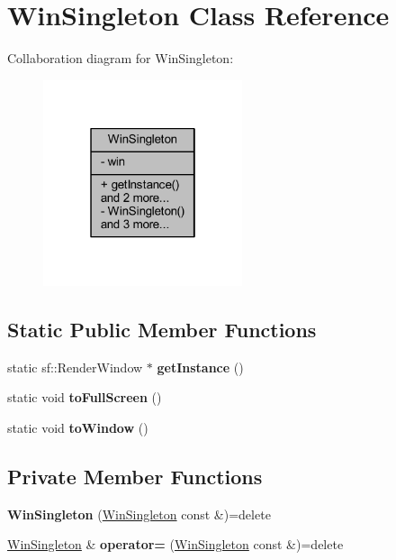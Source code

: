 \hypertarget{class_win_singleton}{}\section{Win\+Singleton Class Reference}
\label{class_win_singleton}


Collaboration diagram for Win\+Singleton\+:\nopagebreak
\begin{figure}[H]
\begin{center}
\leavevmode
\includegraphics[width=166pt]{class_win_singleton__coll__graph}
\end{center}
\end{figure}
\subsection*{Static Public Member Functions}
\begin{DoxyCompactItemize}
\item 
\mbox{\label{class_win_singleton_a82935bb60c8e4bb14350ac45813b33ca}} 
static sf\+::\+Render\+Window $\ast$ {\bfseries get\+Instance} ()
\item 
\mbox{\label{class_win_singleton_a58684b65df9dadcdc798faba86aeb0b6}} 
static void {\bfseries to\+Full\+Screen} ()
\item 
\mbox{\label{class_win_singleton_abba34d9cbdf6a9ff14da654b2b88aba3}} 
static void {\bfseries to\+Window} ()
\end{DoxyCompactItemize}
\subsection*{Private Member Functions}
\begin{DoxyCompactItemize}
\item 
\mbox{\label{class_win_singleton_a8afac0ce148375d8e3d953e881891b53}} 
{\bfseries Win\+Singleton} (\hyperlink{class_win_singleton}{Win\+Singleton} const \&)=delete
\item 
\mbox{\label{class_win_singleton_a8585d53112439fe088484c9cbf8a26b6}} 
\hyperlink{class_win_singleton}{Win\+Singleton} \& {\bfseries operator=} (\hyperlink{class_win_singleton}{Win\+Singleton} const \&)=delete
\end{DoxyCompactItemize}
